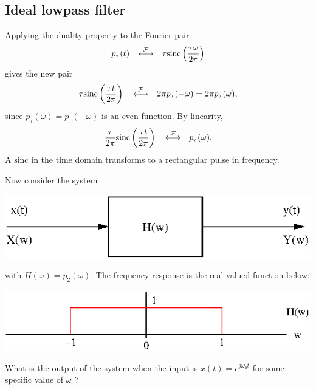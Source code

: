 \documentclass[10pt]{beamer}
\newcommand{\ftpair}{{\stackrel{\cal F}{\longleftrightarrow}}}
\begin{document}
\subsection{Ideal lowpass filter}

Applying the duality property to the Fourier pair
\begin{equation*}
  p_{\tau}(t) \quad \ftpair \quad \tau \text{sinc} \left( \frac{\tau \omega}{2 \pi} \right)
\end{equation*}
gives the new pair
\begin{equation*}
  \tau \text{sinc} \left( \frac{\tau t}{2 \pi} \right) \quad \ftpair \quad 2 \pi p_{\tau}(-\omega)
  = 2 \pi p_{\tau}(\omega),
\end{equation*}
since $p_{\tau}(\omega) = p_{\tau}(-\omega)$ is an even function.  By linearity,
\begin{equation*}
  \frac{\tau}{2 \pi} \text{sinc} \left( \frac{\tau t}{2 \pi} \right) \quad \ftpair \quad p_{\tau}(\omega).
\end{equation*}
A $\text{sinc}$ in the time domain transforms to a rectangular pulse in frequency.  

Now consider the system
\begin{center}
  \includegraphics{simpleltisystemfreq}
\end{center}
with $H(\omega) = p_2(\omega)$.  The frequency response is the real-valued function below:
\begin{center}
  \includegraphics{ideallpffreq}
\end{center}
What is the output of the system when the input is $x(t) = e^{j \omega_0 t}$ for some specific value of $\omega_0$?
\end{document}
